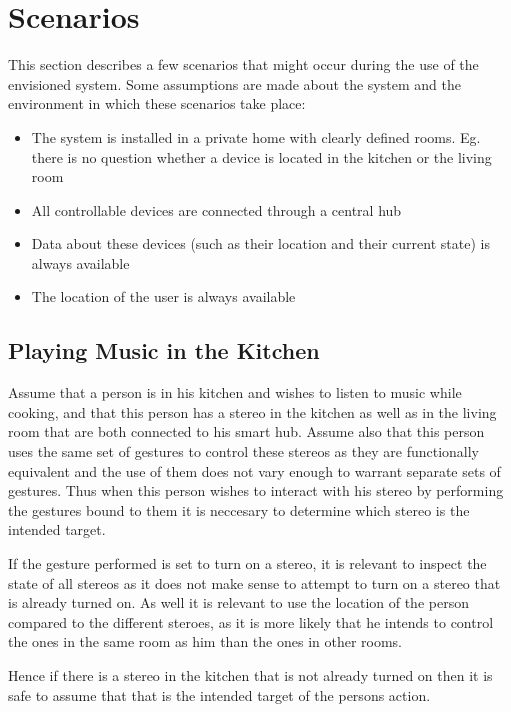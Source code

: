\section{Scenarios}
\label{sec:analysis:scenarios}

This section describes a few scenarios that might occur during the use of the envisioned system. Some assumptions are made about the system and the environment in which these scenarios take place:

\begin{itemize}
    \item The system is installed in a private home with clearly defined rooms. Eg. there is no question whether a device is located in the kitchen or the living room
    \item All controllable devices are connected through a central hub
    \item Data about these devices (such as their location and their current state) is always available
    \item The location of the user is always available
\end{itemize}

\subsection{Playing Music in the Kitchen}
\label{sec:analysis:scenarios:playing_music}

Assume that a person is in his kitchen and wishes to listen to music while cooking, and that this person has a stereo in the kitchen as well as in the living room that are both connected to his smart hub.
Assume also that this person uses the same set of gestures to control these stereos as they are functionally equivalent and the use of them does not vary enough to warrant separate sets of gestures.
Thus when this person wishes to interact with his stereo by performing the gestures bound to them it is neccesary to determine which stereo is the intended target.

If the gesture performed is set to turn on a stereo, it is relevant to inspect the state of all stereos as it does not make sense to attempt to turn on a stereo that is already turned on.
As well it is relevant to use the location of the person compared to the different steroes, as it is more likely that he intends to control the ones in the same room as him than the ones in other rooms.

Hence if there is a stereo in the kitchen that is not already turned on then it is safe to  assume that that is the intended target of the persons action.

